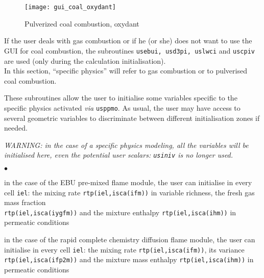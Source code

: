 {{{\begin{figure}[!ht]
\begin{center}
\texttt{[image: gui\_coal\_oxydant]}
\caption{Pulverized coal combustion, oxydant}
\label{fig:Ini-coal5}
\end{center}
\end{figure}

If the user deals with gas combustion or if he (or she) does not want to use the GUI for coal combustion, the subroutines \texttt{usebui, usd3pi, uslwci} and \texttt{uscpiv} are used (only during the calculation initialisation).\\
In this section, ``specific physics'' will refer to gas combustion or
to pulverised coal combustion.

These subroutines allow the user to initialise some variables specific
to the specific physics activated {\em via} \texttt{usppmo}. As usual,
the user may have access to several geometric variables to discriminate
between different initialisation zones if needed.

{\em WARNING: in the case of a specific physics modeling, all the
variables will be initialised here, even the potential user scalars: {\em
\texttt{usiniv}} is no longer used.}


\begin{list}{$\bullet$}{}
       \item in the case of the EBU pre-mixed flame module, the user can
             initialise in every cell \texttt{iel}: the mixing rate
             \texttt{rtp(iel,isca(ifm))} in variable richness, the
             fresh gas mass fraction \\
             \texttt{rtp(iel,isca(iygfm))}
             and the mixture enthalpy \texttt{rtp(iel,isca(ihm))} in
             permeatic conditions

        \item in the case of the rapid complete chemistry diffusion flame
             module, the user can initialise in every cell \texttt{iel}: the
             mixing rate \texttt{rtp(iel,isca(ifm))}, its variance
             \texttt{rtp(iel,isca(ifp2m))} and the mixture mass
             enthalpy \texttt{rtp(iel,isca(ihm))} in permeatic conditions


\end{list}}}}
